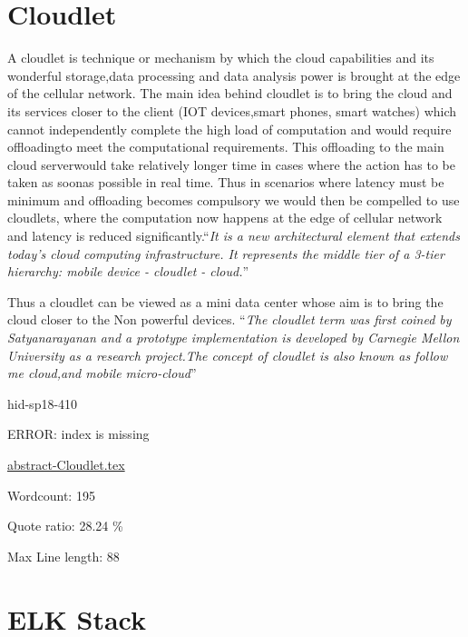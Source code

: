 \section{Cloudlet}


A cloudlet is technique or mechanism by which the cloud capabilities
and its wonderful storage,data processing and data analysis power is
brought at the edge of the cellular network.  The main idea behind
cloudlet is to bring the cloud and its services closer to the
client (IOT devices,smart phones, smart watches) which cannot
independently complete the high load of computation and would require
offloadingto meet the computational requirements. This offloading to
the main cloud serverwould take relatively longer time in cases where
the action has to be taken as soonas possible in real time. Thus in
scenarios where latency must be minimum and offloading becomes
compulsory we would then be compelled to use cloudlets, where the
computation now happens at the edge of cellular network and latency is
reduced significantly.\color{blue}``\emph{It is a new architectural element that extends
today’s cloud computing infrastructure.  It represents the middle tier
of a 3-tier hierarchy: mobile device - cloudlet -
cloud.}''\color{black}~\cite{hid-sp18-410-wikiCloudlet}

Thus a cloudlet can be viewed as a mini data center whose aim is to
bring the cloud closer to the Non powerful devices. \color{blue}``\emph{The cloudlet
term was first coined by Satyanarayanan and a prototype implementation
is developed by Carnegie Mellon University as a research project.The
concept of cloudlet is also known as follow me cloud,and mobile
micro-cloud}''\color{black}~\cite{hid-sp18-410-wikiCloudlet}


\begin{IU}

hid-sp18-410

ERROR: index is missing

\href{https://github.com/cloudmesh-community/hid-sp18-410/blob/master//technology/abstract-Cloudlet.tex}{abstract-Cloudlet.tex}

 

Wordcount: 195


Quote ratio: 28.24 \%
 
Max Line length: 88
\end{IU}

\section{ELK Stack}

